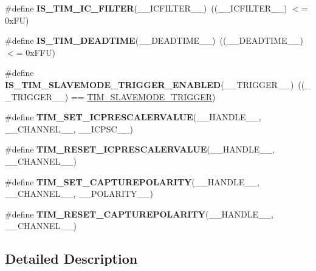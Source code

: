 \begin{DoxyCompactItemize}
\#define {\bfseries I\+S\+\_\+\+T\+I\+M\+\_\+\+I\+C\+\_\+\+F\+I\+L\+T\+ER}(\+\_\+\+\_\+\+I\+C\+F\+I\+L\+T\+E\+R\+\_\+\+\_\+)~((\+\_\+\+\_\+\+I\+C\+F\+I\+L\+T\+E\+R\+\_\+\+\_\+) $<$= 0x\+F\+U)
\item 
\mbox{\label{group___t_i_m___private___macros_ga223fe03967fab834c92f4159fa2e2817}} 
\#define {\bfseries I\+S\+\_\+\+T\+I\+M\+\_\+\+D\+E\+A\+D\+T\+I\+ME}(\+\_\+\+\_\+\+D\+E\+A\+D\+T\+I\+M\+E\+\_\+\+\_\+)~((\+\_\+\+\_\+\+D\+E\+A\+D\+T\+I\+M\+E\+\_\+\+\_\+) $<$= 0x\+F\+F\+U)
\item 
\mbox{\label{group___t_i_m___private___macros_ga44d4f84407e34dbd1ac3ccba12684975}} 
\#define {\bfseries I\+S\+\_\+\+T\+I\+M\+\_\+\+S\+L\+A\+V\+E\+M\+O\+D\+E\+\_\+\+T\+R\+I\+G\+G\+E\+R\+\_\+\+E\+N\+A\+B\+L\+ED}(\+\_\+\+\_\+\+T\+R\+I\+G\+G\+E\+R\+\_\+\+\_\+)~((\+\_\+\+\_\+\+T\+R\+I\+G\+G\+E\+R\+\_\+\+\_\+) == \hyperlink{group___t_i_m___slave___mode_ga12f8f7b4a16b438f54cf811f0bb0a8a4}{T\+I\+M\+\_\+\+S\+L\+A\+V\+E\+M\+O\+D\+E\+\_\+\+T\+R\+I\+G\+G\+ER})
\item 
\#define {\bfseries T\+I\+M\+\_\+\+S\+E\+T\+\_\+\+I\+C\+P\+R\+E\+S\+C\+A\+L\+E\+R\+V\+A\+L\+UE}(\+\_\+\+\_\+\+H\+A\+N\+D\+L\+E\+\_\+\+\_\+,  \+\_\+\+\_\+\+C\+H\+A\+N\+N\+E\+L\+\_\+\+\_\+,  \+\_\+\+\_\+\+I\+C\+P\+S\+C\+\_\+\+\_\+)
\item 
\#define {\bfseries T\+I\+M\+\_\+\+R\+E\+S\+E\+T\+\_\+\+I\+C\+P\+R\+E\+S\+C\+A\+L\+E\+R\+V\+A\+L\+UE}(\+\_\+\+\_\+\+H\+A\+N\+D\+L\+E\+\_\+\+\_\+,  \+\_\+\+\_\+\+C\+H\+A\+N\+N\+E\+L\+\_\+\+\_\+)
\item 
\#define {\bfseries T\+I\+M\+\_\+\+S\+E\+T\+\_\+\+C\+A\+P\+T\+U\+R\+E\+P\+O\+L\+A\+R\+I\+TY}(\+\_\+\+\_\+\+H\+A\+N\+D\+L\+E\+\_\+\+\_\+,  \+\_\+\+\_\+\+C\+H\+A\+N\+N\+E\+L\+\_\+\+\_\+,  \+\_\+\+\_\+\+P\+O\+L\+A\+R\+I\+T\+Y\+\_\+\+\_\+)
\item 
\#define {\bfseries T\+I\+M\+\_\+\+R\+E\+S\+E\+T\+\_\+\+C\+A\+P\+T\+U\+R\+E\+P\+O\+L\+A\+R\+I\+TY}(\+\_\+\+\_\+\+H\+A\+N\+D\+L\+E\+\_\+\+\_\+,  \+\_\+\+\_\+\+C\+H\+A\+N\+N\+E\+L\+\_\+\+\_\+)
\end{DoxyCompactItemize}


\subsection{Detailed Description}



